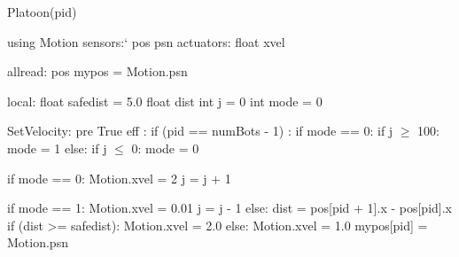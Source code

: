 Platoon(pid)

using Motion 
    sensors:`
       pos psn
    actuators:
       float xvel
       
allread:
   pos mypos = Motion.psn

local:
   float safedist = 5.0
   float dist 
   int j = 0 
   int mode = 0
   
   
SetVelocity:
  pre True
  eff :
     if (pid == numBots - 1) :
        if mode == 0:
            if j $\geq$ 100:
                 mode = 1
        else:
            if j $\leq$ 0:
                mode = 0
                
        if mode == 0:
            Motion.xvel = 2
            j = j + 1
          
        if mode == 1:
            Motion.xvel = 0.01
            j = j - 1
     else:
        dist = pos[pid + 1].x - pos[pid].x
        if (dist >= safedist):
            Motion.xvel = 2.0
        else:
            Motion.xvel = 1.0
    mypos[pid] = Motion.psn

